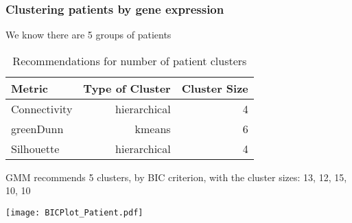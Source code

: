 \documentclass[10pt,dvipsnames,table, handout]{beamer} %
\DeclarePairedDelimiter\ceil{\lceil}{\rceil}
\begin{document}
\begin{frame}
\frametitle{Clustering patients by gene expression}
{\footnotesize
We know there are 5 groups of patients
\begin{table}[H]
\centering
\begin{tabular}{l|r|r}
\hline
Metric & Type of Cluster & Cluster Size \\ 
\hline
Connectivity & hierarchical & 4 \\
greenDunn & kmeans & 6 \\
Silhouette & hierarchical & 4 \\
\hline
\end{tabular}
\caption{Recommendations for number of patient clusters}
\end{table}
\pause 
GMM recommends 5 clusters, by BIC criterion, with the cluster sizes: 13, 12, 15, 10, 10
}
\begin{center}
\texttt{[image: BICPlot\_Patient.pdf]} \\
\end{center}
\end{frame}

\end{document}
